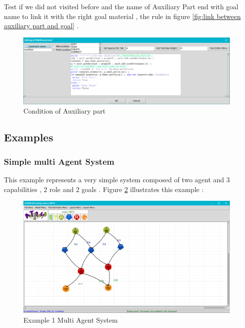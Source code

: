  
Test if we did not visited before  and the name of Auxiliary Part end with goal name to link it with the right goal material , the rule in figure \ref{fig:link between auxiliary part and goal}  .
 
 
 
\begin{figure}[th]
	\centering
 	\includegraphics[scale=0.37]{Chapiter3/img/condaux}
	\caption{\label{fig:Condition of Auxiliary part}Condition of Auxiliary part  }
\end{figure} 



 
\subsection{ Examples }

\subsubsection{ Simple multi Agent System }
This example represents a very simple system composed of  two agent and 3 capabilities , 2 role and 2 goals  .
 Figure \ref{fig:Example 1 Multi Agent System } illustrates this example :
\begin{figure}[th]
	\centering
 	\includegraphics[scale=0.3]{Chapiter3/img/omacs_model}
	\caption{\label{fig:Example 1 Multi Agent System }Example 1 Multi Agent System}
\end{figure} 
 
